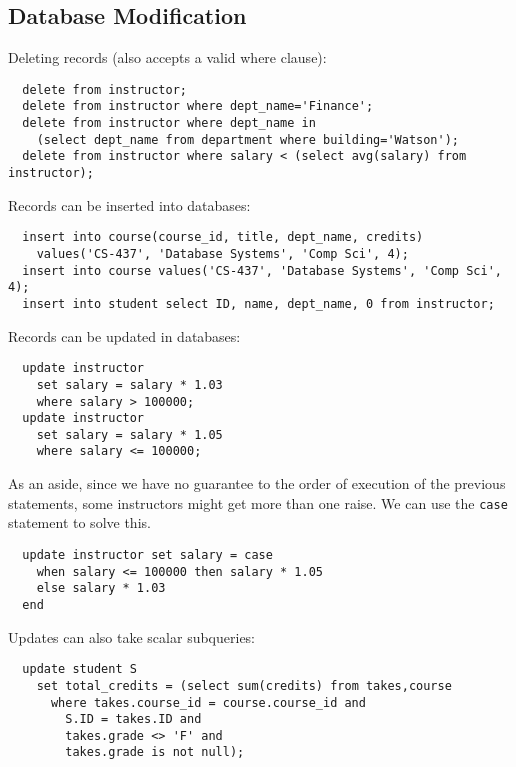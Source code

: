 \documentclass{math}
\begin{document}
\subsection*{Database Modification}
Deleting records (also accepts a valid where clause):
\begin{lstlisting}
  delete from instructor;
  delete from instructor where dept_name='Finance';
  delete from instructor where dept_name in
    (select dept_name from department where building='Watson');
  delete from instructor where salary < (select avg(salary) from instructor);
\end{lstlisting}
Records can be inserted into databases:
\begin{lstlisting}
  insert into course(course_id, title, dept_name, credits)
    values('CS-437', 'Database Systems', 'Comp Sci', 4);
  insert into course values('CS-437', 'Database Systems', 'Comp Sci', 4);
  insert into student select ID, name, dept_name, 0 from instructor;
\end{lstlisting}
Records can be updated in databases:
\begin{lstlisting}
  update instructor
    set salary = salary * 1.03
    where salary > 100000;
  update instructor
    set salary = salary * 1.05
    where salary <= 100000;
\end{lstlisting}
As an aside, since we have no guarantee to the order of execution of the
previous statements, some instructors might get more than one raise. We can
use the \texttt{case} statement to solve this.
\begin{lstlisting}
  update instructor set salary = case
    when salary <= 100000 then salary * 1.05
    else salary * 1.03
  end
\end{lstlisting}
Updates can also take scalar subqueries:
\begin{lstlisting}
  update student S
    set total_credits = (select sum(credits) from takes,course
      where takes.course_id = course.course_id and
        S.ID = takes.ID and
        takes.grade <> 'F' and
        takes.grade is not null);
\end{lstlisting}
\end{document}
